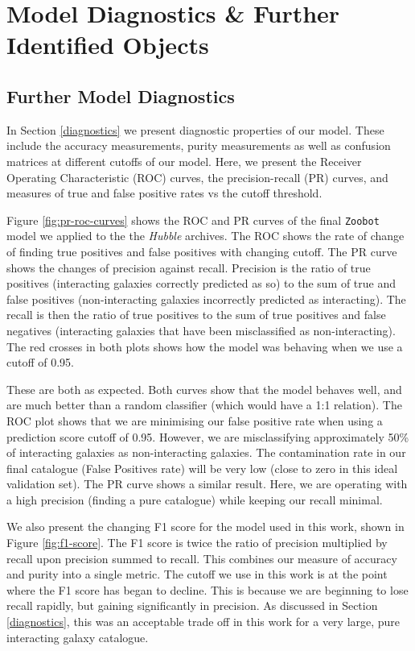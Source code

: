 \chapter{Model Diagnostics \& Further Identified Objects}

\section{Further Model Diagnostics}\label{further-diagnostics}
\noindent In Section \ref{diagnostics} we present diagnostic properties of our model. These include the accuracy measurements, purity measurements as well as confusion matrices at different cutoffs of our model. Here, we present the Receiver Operating Characteristic (ROC) curves, the precision-recall (PR) curves, and measures of true and false positive rates vs the cutoff threshold.

Figure \ref{fig:pr-roc-curves} shows the ROC and PR curves of the final \texttt{Zoobot} model we applied to the the \emph{Hubble} archives. The ROC shows the rate of change of finding true positives and false positives with changing cutoff. The PR curve shows the changes of precision against recall. Precision is the ratio of true positives (interacting galaxies correctly predicted as so) to the sum of true and false positives (non-interacting galaxies incorrectly predicted as interacting). The recall is then the ratio of true positives to the sum of true positives and false negatives (interacting galaxies that have been misclassified as non-interacting). The red crosses in both plots shows how the model was behaving when we use a cutoff of 0.95. 

These are both as expected. Both curves show that the model behaves well, and are much better than a random classifier (which would have a 1:1 relation). The ROC plot shows that we are minimising our false positive rate when using a prediction score cutoff of 0.95. However, we are misclassifying approximately 50\% of interacting galaxies as non-interacting galaxies. The contamination rate in our final catalogue (False Positives rate) will be very low (close to zero in this ideal validation set). The PR curve shows a similar result. Here, we are operating with a high precision (finding a pure catalogue) while keeping our recall minimal. 

We also present the changing F1 score for the model used in this work, shown in Figure \ref{fig:f1-score}. The F1 score is twice the ratio of precision multiplied by recall upon precision summed to recall. This combines our measure of accuracy and purity into a single metric. The cutoff we use in this work is at the point where the F1 score has began to decline. This is because we are beginning to lose recall rapidly, but gaining significantly in precision. As discussed in Section \ref{diagnostics}, this was an acceptable trade off in this work for a very large, pure interacting galaxy catalogue.

